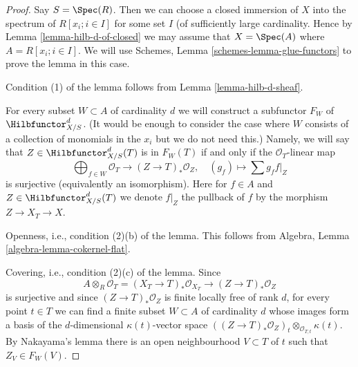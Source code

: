 \begin{proof}
Say $S = \Spec(R)$. Then we can choose a closed immersion of $X$
into the spectrum of $R[x_i; i \in I]$ for some set $I$ (of sufficiently
large cardinality. Hence by Lemma \ref{lemma-hilb-d-of-closed}
we may assume that $X = \Spec(A)$ where $A = R[x_i; i \in I]$.
We will use Schemes, Lemma \ref{schemes-lemma-glue-functors} to prove the
lemma in this case.

\medskip\noindent
Condition (1) of the lemma follows from Lemma \ref{lemma-hilb-d-sheaf}.

\medskip\noindent
For every subset $W \subset A$ of cardinality $d$ we will
construct a subfunctor $F_W$ of $\Hilbfunctor^d_{X/S}$.
(It would be enough to consider the case where $W$ consists of a
collection of monomials in the $x_i$ but we do not need this.)
Namely, we will say that $Z \in \Hilbfunctor^d_{X/S}(T)$ is in $F_W(T)$
if and only if the $\mathcal{O}_T$-linear map
$$
\bigoplus\nolimits_{f \in W} \mathcal{O}_T
\longrightarrow
(Z \to T)_*\mathcal{O}_Z,\quad
(g_f) \longmapsto \sum g_f f|_Z
$$
is surjective (equivalently an isomorphism). Here for $f \in A$
and $Z \in \Hilbfunctor^d_{X/S}(T)$ we denote $f|_Z$ the pullback of $f$
by the morphism $Z \to X_T \to X$.

\medskip\noindent
Openness, i.e., condition (2)(b) of the lemma. This follows from
Algebra, Lemma \ref{algebra-lemma-cokernel-flat}.

\medskip\noindent
Covering, i.e., condition (2)(c) of the lemma. Since
$$
A \otimes_R \mathcal{O}_T =
(X_T \to T)_*\mathcal{O}_{X_T} \to (Z \to T)_*\mathcal{O}_Z
$$
is surjective and since $(Z \to T)_*\mathcal{O}_Z$ is finite locally
free of rank $d$, for every point $t \in T$ we can find a finite
subset $W \subset A$ of cardinality $d$ whose images form a basis
of the $d$-dimensional $\kappa(t)$-vector space
$((Z \to T)_*\mathcal{O}_Z)_t \otimes_{\mathcal{O}_{T, t}} \kappa(t)$.
By Nakayama's lemma there is an open neighbourhood $V \subset T$
of $t$ such that $Z_V \in F_W(V)$.


\end{proof}
